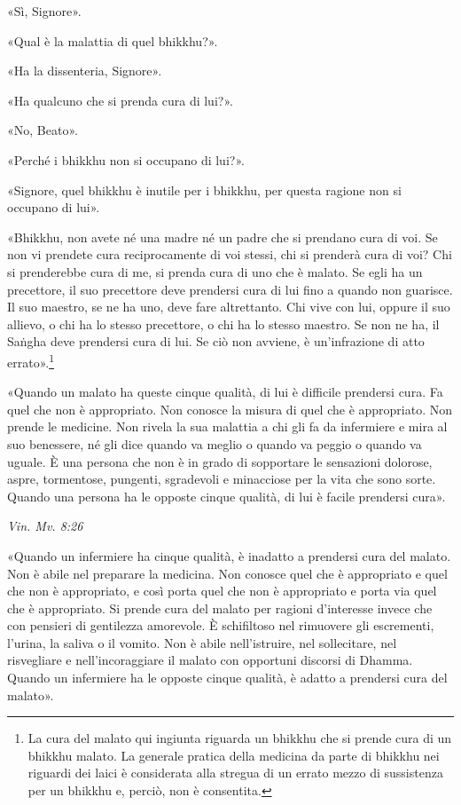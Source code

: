 «Sì, Signore».


«Qual è la malattia di quel bhikkhu?».


«Ha la dissenteria, Signore».


«Ha qualcuno che si prenda cura di lui?».


«No, Beato».


«Perché i bhikkhu non si occupano di lui?».


«Signore, quel bhikkhu è inutile per i bhikkhu, per questa ragione non
si occupano di lui».


«Bhikkhu, non avete né una madre né un padre che si prendano cura di
voi. Se non vi prendete cura reciprocamente di voi stessi, chi si
prenderà cura di voi? Chi si prenderebbe cura di me, si prenda cura di
uno che è malato. Se egli ha un precettore, il suo precettore deve
prendersi cura di lui fino a quando non guarisce. Il suo maestro, se ne
ha uno, deve fare altrettanto. Chi vive con lui, oppure il suo allievo,
o chi ha lo stesso precettore, o chi ha lo stesso maestro. Se non ne ha,
il Saṅgha deve prendersi cura di lui. Se ciò non avviene, è
un’infrazione di atto errato».\footnote{La cura del malato qui ingiunta riguarda un bhikkhu che si prende cura di un bhikkhu malato. La generale pratica della medicina da parte di bhikkhu nei riguardi dei laici è considerata alla stregua di un errato mezzo di sussistenza per un bhikkhu e, perciò, non è consentita.}


«Quando un malato ha queste cinque qualità, di lui è difficile prendersi
cura. Fa quel che non è appropriato. Non conosce la misura di quel che è
appropriato. Non prende le medicine. Non rivela la sua malattia a chi
gli fa da infermiere e mira al suo benessere, né gli dice quando va
meglio o quando va peggio o quando va uguale. È una persona che non è in
grado di sopportare le sensazioni dolorose, aspre, tormentose, pungenti,
sgradevoli e minacciose per la vita che sono sorte. Quando una persona
ha le opposte cinque qualità, di lui è facile prendersi cura».


\emph{Vin. Mv. 8:26}


«Quando un infermiere ha cinque qualità, è inadatto a prendersi cura del
malato. Non è abile nel preparare la medicina. Non conosce quel che è
appropriato e quel che non è appropriato, e così porta quel che non è
appropriato e porta via quel che è appropriato. Si prende cura del
malato per ragioni d’interesse invece che con pensieri di gentilezza
amorevole. È schifiltoso nel rimuovere gli escrementi, l’urina, la
saliva o il vomito. Non è abile nell’istruire, nel sollecitare, nel
risvegliare e nell’incoraggiare il malato con opportuni discorsi di
Dhamma. Quando un infermiere ha le opposte cinque qualità, è adatto a
prendersi cura del malato».


